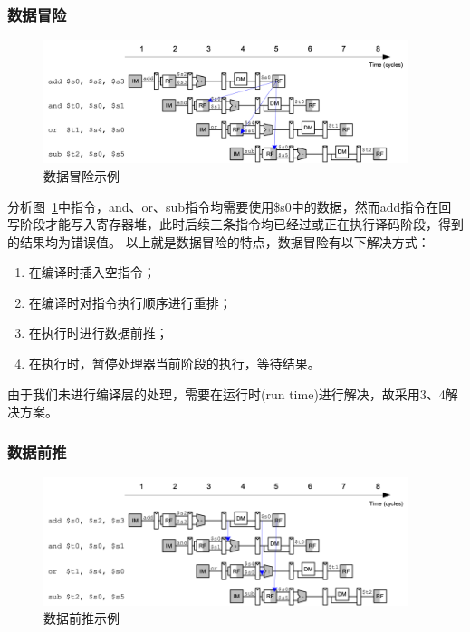 \subsubsection{数据冒险}
\begin{figure}[htbp]
    \centering
    \includegraphics[width = 0.95\textwidth]{image/data_hazard.png}
    \caption{数据冒险示例}
    \label{fig:section_2_3}
\end{figure}
分析图~\ref{fig:section_2_3}中指令，and、or、sub指令均需要使用\$s0中的数据，然而add指令在回写阶段才能写入寄存器堆，此时后续三条指令均已经过或正在执行译码阶段，得到的结果均为错误值。
以上就是数据冒险的特点，数据冒险有以下解决方式：
\begin{enumerate}
    \item 在编译时插入空指令；
    \item 在编译时对指令执行顺序进行重排；
    \item 在执行时进行数据前推；
    \item 在执行时，暂停处理器当前阶段的执行，等待结果。
\end{enumerate}
由于我们未进行编译层的处理，需要在运行时(run time)进行解决，故采用3、4解决方案。

\subsubsection{数据前推}
\begin{figure}[htbp]
    \centering
    \includegraphics[width = 0.95\textwidth]{image/data_forward.png}
    \caption{数据前推示例}
    \label{fig:section_2_4}
\end{figure}

